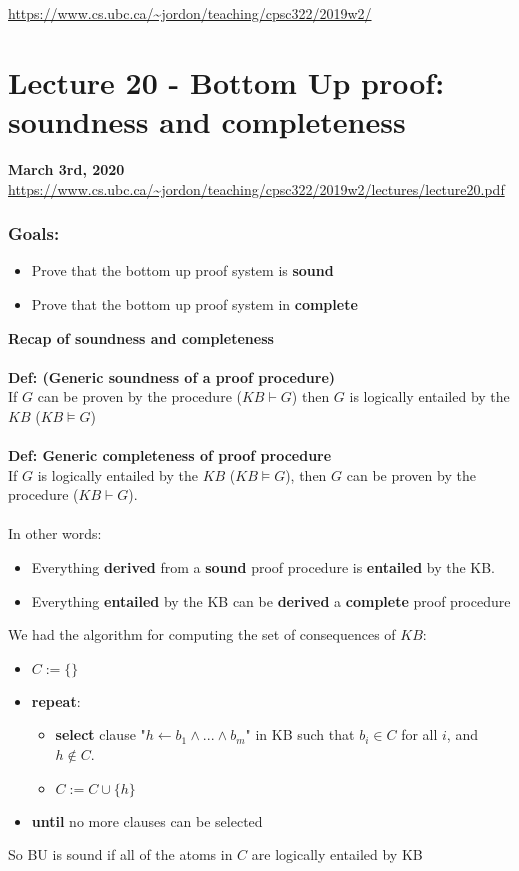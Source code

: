 \documentclass{article}
\def\blu#1{{\color{blu}#1}}
\def\gre#1{{\color{gre}#1}}
\begin{document}
\noindent \url{https://www.cs.ubc.ca/~jordon/teaching/cpsc322/2019w2/}
\section*{Lecture 20 - Bottom Up proof: soundness and completeness}
\textbf{March 3rd, 2020}\\
\url{https://www.cs.ubc.ca/~jordon/teaching/cpsc322/2019w2/lectures/lecture20.pdf}
\subsubsection*{Goals:}
\begin{itemize}
	\item Prove that the bottom up proof system is \textbf{\blu{sound}}
	\item Prove that the bottom up proof system in \textbf{\blu{complete}}
\end{itemize}
\textbf{Recap of soundness and completeness}\\
\\
\textbf{Def: (Generic soundness of a proof procedure)}\\
If $ G  $ can be proven by the procedure ($ KB \vdash G $) then $ G $ is logically entailed by the $ KB $ ($ KB \vDash G $)\\
\\
\textbf{Def: Generic completeness of proof procedure}\\
If $ G $ is logically entailed by the $ KB $ ($ KB \vDash G $), then $ G $ can be proven by the procedure ($KB \vdash G $). \\
\\
In other words:
\begin{itemize}
	\item Everything \gre{\textbf{derived}} from a \textbf{\blu{sound}} proof procedure is \textbf{\color{Fuchsia}entailed} by the KB.
	\item Everything \textbf{\color{Fuchsia}entailed} by the KB can be \gre{\textbf{derived}} a \textbf{\blu{complete}} proof procedure
\end{itemize}
We had the algorithm for computing the set of consequences of $ KB $:
\begin{itemize}[label = ]
	\item $ C := \{\} $
	\item \textbf{repeat}:
	\begin{itemize}[label = ]
		\item 	\textbf{select} clause "$ h \leftarrow b_1 \land ... \land b_m $" in KB such that $ b_i \in C $ for all $ i $, and $ h \notin C $. 
		\item $ C := C \cup \{h\} $
	\end{itemize}
	\item \textbf{until} no more clauses can be selected
\end{itemize}
So BU is sound if all of the atoms in $ C $ are logically entailed by KB
\end{document}
